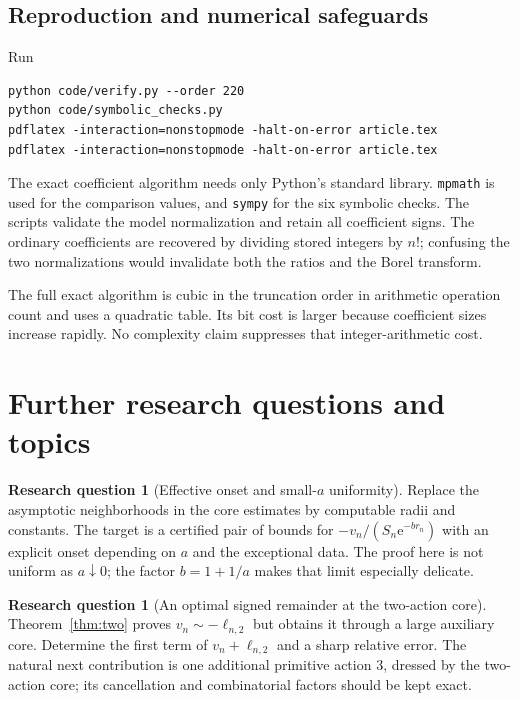 \documentclass[11pt,a4paper]{article}
\numberwithin{equation}{section}
\theoremstyle{definition}
\newtheorem{question}[theorem]{Research question}
\theoremstyle{remark}\newtheorem{remark}[theorem]{Remark}
\newcommand{\ee}{\mathrm e}\newcommand{\dd}{\mathrm d}
\begin{document}
\subsection{Reproduction and numerical safeguards}
Run
\begin{verbatim}
python code/verify.py --order 220
python code/symbolic_checks.py
pdflatex -interaction=nonstopmode -halt-on-error article.tex
pdflatex -interaction=nonstopmode -halt-on-error article.tex
\end{verbatim}
The exact coefficient algorithm needs only Python's standard library.
\texttt{mpmath} is used for the comparison values, and \texttt{sympy} for the
six symbolic checks. The scripts validate the model normalization and retain
all coefficient signs. The ordinary coefficients are recovered by dividing
stored integers by $n!$; confusing the two normalizations would invalidate
both the ratios and the Borel transform.

The full exact algorithm is cubic in the truncation order in arithmetic
operation count and uses a quadratic table. Its bit cost is larger because
coefficient sizes increase rapidly. No complexity claim suppresses that
integer-arithmetic cost.

\section{Further research questions and topics}
\label{sec:questions}

\begin{question}[Effective onset and small-$a$ uniformity]
Replace the asymptotic neighborhoods in the core estimates by computable
radii and constants. The target is a certified pair of bounds for
$-v_n/(S_n\ee^{-br_n})$ with an explicit onset depending on $a$ and the
exceptional data. The proof here is not uniform as $a\downarrow0$; the
factor $b=1+1/a$ makes that limit especially delicate.
\end{question}

\begin{question}[An optimal signed remainder at the two-action core]
Theorem~\ref{thm:two} proves $v_n\sim-\ell_{n,2}$ but obtains it through a
large auxiliary core. Determine the first term of
$v_n+\ell_{n,2}$ and a sharp relative error. The natural next contribution
is one additional primitive action $3$, dressed by the two-action core;
its cancellation and combinatorial factors should be kept exact.
\end{question}
\end{document}
